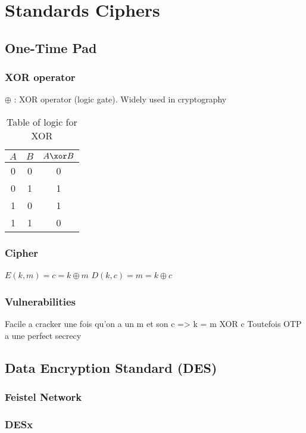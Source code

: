 \chapter{Standards Ciphers}


\section{One-Time Pad}

\subsection{XOR operator}

$\oplus$ : XOR operator (logic gate). Widely used in cryptography

\begin{table}[ht!]
	\centering
		\begin{tabular}{c|c|c}
			$A$ & $B$ & $A\xor B$ \\
			\hline
			0 & 0 & 0 \\
			0 & 1 & 1 \\
			1 & 0 & 1 \\
			1 & 1 & 0 \\
			\hline 
		\end{tabular}
	\caption{Table of logic for XOR}
	\label{tab:TableOfLogicForXOR}
\end{table}


\subsection{Cipher}
	$ E(k,m) = c = k \oplus m $ 
	$ D(k,c ) = m = k \oplus c$
	
	
\subsection{Vulnerabilities}

Facile a cracker une fois qu'on a un m et son c => k = m XOR c
Toutefois OTP a une perfect secrecy


\section{Data Encryption Standard (DES)}
\subsection{Feistel Network}
\subsection{DESx}
